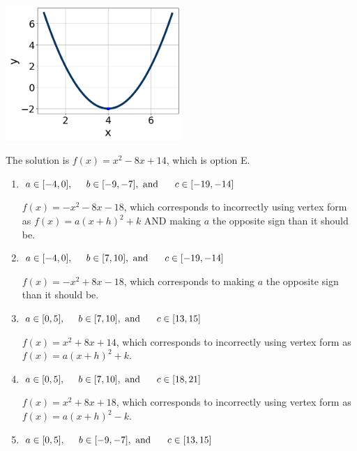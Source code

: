 \documentclass{extbook}[14pt]
\begin{document}
\begin{enumerate}
{\begin{center}
    \includegraphics[width=0.5\textwidth]{../Figures/quadraticGraphToEquationB.png}
\end{center}



The solution is \( f(x) = x^{2} -8 x + 14 \), which is option E.\begin{enumerate}[label=\Alph*.]
\item \( a \in [-4, 0], \hspace*{5mm} b \in [-9, -7], \text{ and } \hspace*{5mm} c \in [-19, -14] \)

$f(x)=-x^{2} -8 x -18$, which corresponds to incorrectly using vertex form as $f(x) = a(x+h)^2+k$ AND making $a$ the opposite sign than it should be.
\item \( a \in [-4, 0], \hspace*{5mm} b \in [7, 10], \text{ and } \hspace*{5mm} c \in [-19, -14] \)

$f(x)=-x^{2} +8 x -18$, which corresponds to making $a$ the opposite sign than it should be.
\item \( a \in [0, 5], \hspace*{5mm} b \in [7, 10], \text{ and } \hspace*{5mm} c \in [13, 15] \)

$f(x)=x^{2} +8 x + 14$, which corresponds to incorrectly using vertex form as $f(x) = a(x+h)^2+k$.
\item \( a \in [0, 5], \hspace*{5mm} b \in [7, 10], \text{ and } \hspace*{5mm} c \in [18, 21] \)

$f(x)=x^{2} +8 x + 18$, which corresponds to incorrectly using vertex form as $f(x) = a(x+h)^2 - k$.
\item \( a \in [0, 5], \hspace*{5mm} b \in [-9, -7], \text{ and } \hspace*{5mm} c \in [13, 15] \)


\end{enumerate}}
\end{enumerate}
\end{document}
